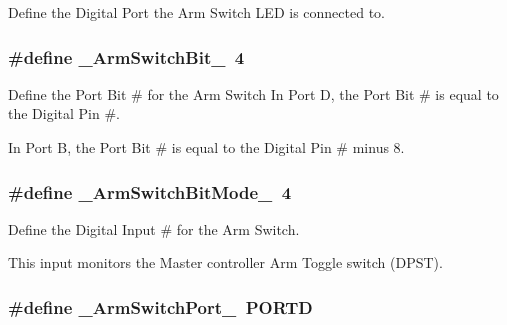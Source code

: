 \-Define the \-Digital \-Port the \-Arm \-Switch \-L\-E\-D is connected to. 

\hypertarget{remotePanel_8ino_aceced00e366c0b2de5b1f6a45e857af2}{
\subsubsection[{\-\_\-\-Arm\-Switch\-Bit\-\_\-}]{\setlength{\rightskip}{0pt plus 5cm}\#define {\bf \-\_\-\-Arm\-Switch\-Bit\-\_\-}~4}}\label{remotePanel_8ino_aceced00e366c0b2de5b1f6a45e857af2}


\-Define the \-Port \-Bit \# for the \-Arm \-Switch \-In \-Port \-D, the \-Port \-Bit \# is equal to the \-Digital \-Pin \#. 

\-In \-Port \-B, the \-Port \-Bit \# is equal to the \-Digital \-Pin \# minus 8. \hypertarget{remotePanel_8ino_a5f2f9a4205afa54acd635b5699e141b5}{
\subsubsection[{\-\_\-\-Arm\-Switch\-Bit\-Mode\-\_\-}]{\setlength{\rightskip}{0pt plus 5cm}\#define {\bf \-\_\-\-Arm\-Switch\-Bit\-Mode\-\_\-}~4}}\label{remotePanel_8ino_a5f2f9a4205afa54acd635b5699e141b5}


\-Define the \-Digital \-Input \# for the \-Arm \-Switch. 

\-This input monitors the \-Master controller \-Arm \-Toggle switch (\-D\-P\-S\-T). \hypertarget{remotePanel_8ino_a0e6aa72e91800dc38319f04a2c81f073}{
\subsubsection[{\-\_\-\-Arm\-Switch\-Port\-\_\-}]{\setlength{\rightskip}{0pt plus 5cm}\#define {\bf \-\_\-\-Arm\-Switch\-Port\-\_\-}~\-P\-O\-R\-T\-D}}\label{remotePanel_8ino_a0e6aa72e91800dc38319f04a2c81f073}


